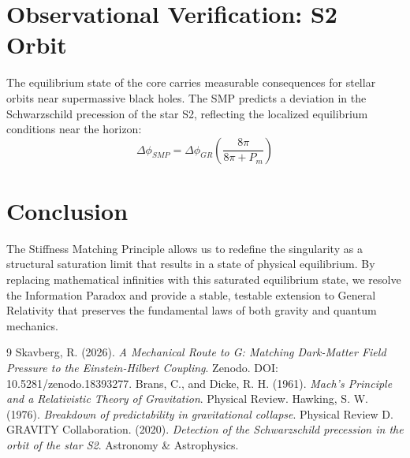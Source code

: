\documentclass[11pt,letterpaper]{article}
\begin{document}
\section{Observational Verification: S2 Orbit}
The equilibrium state of the core carries measurable consequences for stellar orbits near supermassive black holes. The SMP predicts a deviation in the Schwarzschild precession of the star S2, reflecting the localized equilibrium conditions near the horizon:
\begin{equation}
\Delta \phi_{SMP} = \Delta \phi_{GR} \left( \frac{8\pi}{8\pi + P_m} \right)
\end{equation}



\section{Conclusion}
The Stiffness Matching Principle allows us to redefine the singularity as a structural saturation limit that results in a state of physical equilibrium. By replacing mathematical infinities with this saturated equilibrium state, we resolve the Information Paradox and provide a stable, testable extension to General Relativity that preserves the fundamental laws of both gravity and quantum mechanics.

\begin{thebibliography}{9}
Skavberg, R. (2026). \textit{A Mechanical Route to G: Matching Dark-Matter Field Pressure to the Einstein-Hilbert Coupling}. Zenodo. DOI: 10.5281/zenodo.18393277.
Brans, C., and Dicke, R. H. (1961). \textit{Mach's Principle and a Relativistic Theory of Gravitation}. Physical Review.
Hawking, S. W. (1976). \textit{Breakdown of predictability in gravitational collapse}. Physical Review D.
GRAVITY Collaboration. (2020). \textit{Detection of the Schwarzschild precession in the orbit of the star S2}. Astronomy \& Astrophysics.
\end{thebibliography}
\end{document}
